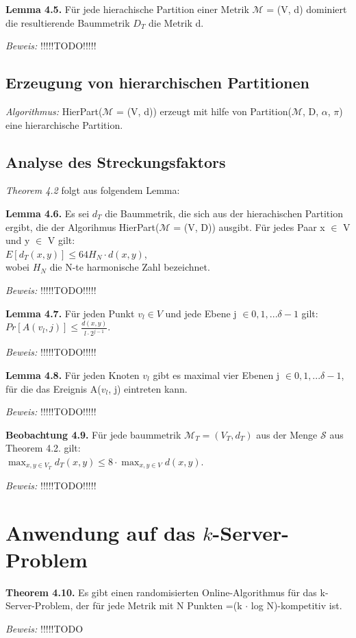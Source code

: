 \textbf{Lemma 4.5.} Für jede hierachische Partition einer Metrik $\mathcal{M}$ = (V, d) dominiert die resultierende Baummetrik $D_{T}$ die Metrik d.

\textit{Beweis:} !!!!!TODO!!!!!

\subsection{Erzeugung von hierarchischen Partitionen}

\textit{Algorithmus:} HierPart($\mathcal{M}$ = (V, d)) erzeugt mit hilfe von Partition($\mathcal{M}$, D, $\alpha$, $\pi$) eine hierarchische Partition.

\subsection{Analyse des Streckungsfaktors}

\textit{Theorem 4.2} folgt aus folgendem Lemma:

\textbf{Lemma 4.6.} Es sei $d_{T}$ die Baummetrik, die sich aus der hierachischen Partition ergibt, die der Algorihmus HierPart($\mathcal{M}$ = (V, D)) ausgibt. Für jedes Paar x $\in$ V und y $\in$ V gilt:\\
$E[d_{T}(x, y)] \le 64 H_{N} \cdot d(x, y)$, \\
wobei $H_{N}$ die N-te harmonische Zahl bezeichnet.

\textit{Beweis:} !!!!!TODO!!!!!

\textbf{Lemma 4.7.} Für jeden Punkt $v_{l} \in V$ und jede Ebene j $\in {0, 1, ... \delta -1}$ gilt: \\
$Pr[A(v_{l}, j)] \le \tfrac{d(x, y)}{l \cdot 2^{j-1}}.$

\textit{Beweis:} !!!!!TODO!!!!!

\textbf{Lemma 4.8.} Für jeden Knoten $v_{l}$ gibt es maximal vier Ebenen j $\in {0, 1, ... \delta - 1}$, für die das Ereignis A($v_{l}$, j) eintreten kann.

\textit{Beweis:} !!!!!TODO!!!!!

\textbf{Beobachtung 4.9.} Für jede baummetrik $\mathcal{M}_{T} = (V_{T}, d_{T})$ aus der Menge $\mathcal{S}$ aus Theorem 4.2. gilt: \\
$\max_{x, y \in V_{T}} d_{T}(x, y) \le 8 \cdot \max_{x, y \in V} d(x, y)$.

\textit{Beweis:} !!!!!TODO!!!!!

\section{Anwendung auf das $k$-Server-Problem}


\textbf{Theorem 4.10.} Es gibt einen randomisierten Online-Algorithmus für das k-Server-Problem, der für jede Metrik mit N Punkten =(k $\cdot$ log N)-kompetitiv ist.

\textit{Beweis:} !!!!!TODO
